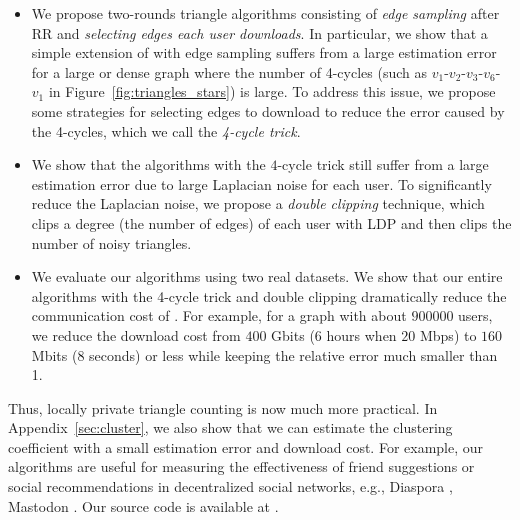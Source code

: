 \begin{itemize}
    \item We propose two-rounds triangle algorithms
consisting of \textit{edge sampling} after RR and \textit{selecting edges each user downloads}.
In particular, we show that a simple extension of \cite{Imola_USENIX21} with edge sampling suffers from a large estimation error for a large or dense graph where the number of 4-cycles (such as $v_1$-$v_2$-$v_3$-$v_6$-$v_1$
in Figure~\ref{fig:triangles_stars}) is large.
To address this issue, we propose some strategies for selecting edges to download to reduce the error caused by the 4-cycles, which we call the \textit{4-cycle trick}.
\item We
show that
the algorithms with the $4$-cycle trick
still suffer from a large estimation error due to
large Laplacian noise for each user.
To significantly reduce the Laplacian noise, 
we
propose a \textit{double clipping} technique,
which clips 
a degree (the number of edges) of each user 
with LDP and then clips the number of noisy triangles. 
\item We evaluate our algorithms using two real datasets.
We show that our entire algorithms with the 4-cycle trick and double clipping
dramatically reduce the communication cost
of
\cite{Imola_USENIX21}.
For example,
for a graph with about $900000$ users,
we reduce the download cost from $400$ Gbits ($6$ hours when $20$ Mbps) to 
$160$ Mbits ($8$ seconds) or less 
while keeping the relative error much smaller than 1.
\end{itemize}
Thus, locally private triangle counting is now much more practical. 
In Appendix~\ref{sec:cluster}, we also show that we can estimate the clustering coefficient with a small estimation error and download cost. 
For example, our algorithms are useful for measuring the effectiveness of friend suggestions or social recommendations in decentralized 
social networks, 
e.g., Diaspora \cite{Diaspora}, Mastodon \cite{Mastodon}. 
Our source code
is available at 
\cite{TriangleLDP}. 

